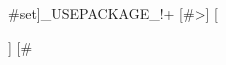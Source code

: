 {#set]_USEPACKAGE_!+
[#>]
[\usepackage[utf8]{inputenc}
\usepackage[T1]{fontenc}
\usepackage{aeguill}
\usepackage{amssymb}
]
[#}
